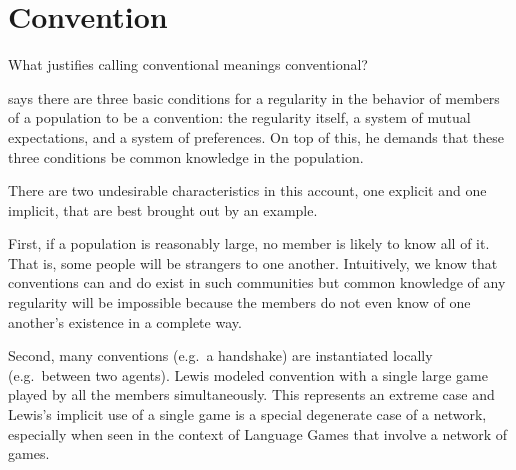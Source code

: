 \chapter{Convention} \label{ch:convention}

What justifies calling conventional meanings conventional?

\citet[58]{lewis:c} says there are three basic conditions for a regularity in the behavior of members of a population to be a convention: the regularity itself, a system of mutual expectations, and a system of preferences. On top of this, he demands that these three conditions be common knowledge in the population.

There are two undesirable characteristics in this account, one explicit and one implicit, that are best brought out by an example.

First, if a population is reasonably large, no member is likely to know all of it. That is, some people will be strangers to one another. Intuitively, we know that conventions can and do exist in such communities but common knowledge of any regularity will be impossible because the members do not even know of one another's existence in a complete way.


Second, many conventions (e.g.\ a handshake) are instantiated locally (e.g.\ between two agents). Lewis modeled convention with a single large game played by all the members simultaneously. This represents an extreme case and Lewis's implicit use of a single game is a special degenerate case of a network, especially when seen in the context of Language Games that involve a network of games.

